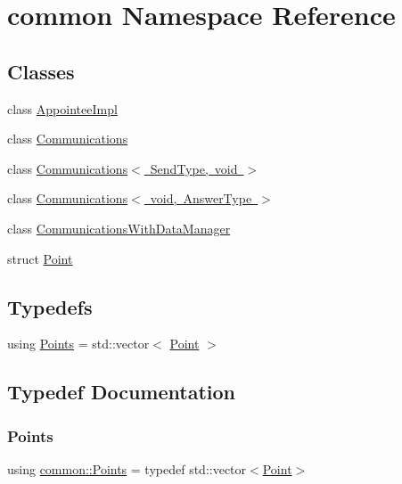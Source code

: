 \hypertarget{namespacecommon}{}\section{common Namespace Reference}
\label{namespacecommon}
\subsection*{Classes}
\begin{DoxyCompactItemize}
\item 
class \mbox{\hyperlink{classcommon_1_1AppointeeImpl}{Appointee\+Impl}}
\item 
class \mbox{\hyperlink{classcommon_1_1Communications}{Communications}}
\item 
class \mbox{\hyperlink{classcommon_1_1Communications_3_01SendType_00_01void_01_4}{Communications$<$ Send\+Type, void $>$}}
\item 
class \mbox{\hyperlink{classcommon_1_1Communications_3_01void_00_01AnswerType_01_4}{Communications$<$ void, Answer\+Type $>$}}
\item 
class \mbox{\hyperlink{classcommon_1_1CommunicationsWithDataManager}{Communications\+With\+Data\+Manager}}
\item 
struct \mbox{\hyperlink{structcommon_1_1Point}{Point}}
\end{DoxyCompactItemize}
\subsection*{Typedefs}
\begin{DoxyCompactItemize}
\item 
using \mbox{\hyperlink{namespacecommon_a1aefa0cce5e127612ab7ca981276ab7e}{Points}} = std\+::vector$<$ \mbox{\hyperlink{structcommon_1_1Point}{Point}} $>$
\end{DoxyCompactItemize}


\subsection{Typedef Documentation}
\mbox{\label{namespacecommon_a1aefa0cce5e127612ab7ca981276ab7e}} 
\subsubsection{\texorpdfstring{Points}{Points}}
{\footnotesize\ttfamily using \mbox{\hyperlink{namespacecommon_a1aefa0cce5e127612ab7ca981276ab7e}{common\+::\+Points}} = typedef std\+::vector$<$\mbox{\hyperlink{structcommon_1_1Point}{Point}}$>$}

